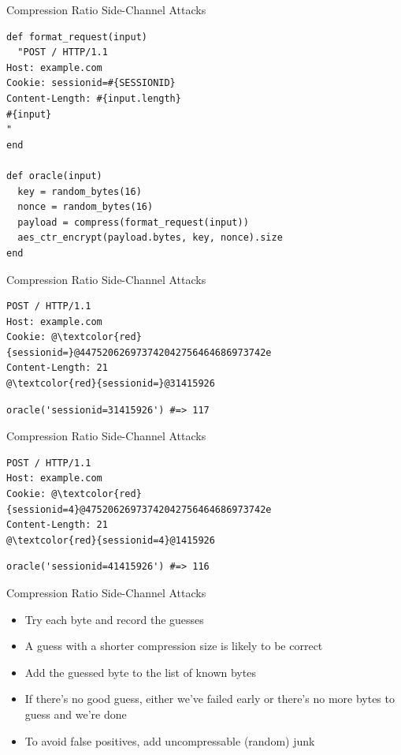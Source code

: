 \documentclass[presentation]{beamer}
\begin{document}
\begin{frame}[fragile,label={sec:org94f0a1a}]{Compression Ratio Side-Channel Attacks}
 \begin{verbatim}
def format_request(input)
  "POST / HTTP/1.1
Host: example.com
Cookie: sessionid=#{SESSIONID}
Content-Length: #{input.length}
#{input}
"
end

def oracle(input)
  key = random_bytes(16)
  nonce = random_bytes(16)
  payload = compress(format_request(input))
  aes_ctr_encrypt(payload.bytes, key, nonce).size
end
\end{verbatim}
\end{frame}

\begin{frame}[fragile,label={sec:org4385c75}]{Compression Ratio Side-Channel Attacks}
 \begin{verbatim}
POST / HTTP/1.1
Host: example.com
Cookie: @\textcolor{red}{sessionid=}@447520626973742042756464686973742e
Content-Length: 21
@\textcolor{red}{sessionid=}@31415926
\end{verbatim}

\begin{verbatim}
oracle('sessionid=31415926') #=> 117
\end{verbatim}
\end{frame}

\begin{frame}[fragile,label={sec:orgc1d28e4}]{Compression Ratio Side-Channel Attacks}
 \begin{verbatim}
POST / HTTP/1.1
Host: example.com
Cookie: @\textcolor{red}{sessionid=4}@47520626973742042756464686973742e
Content-Length: 21
@\textcolor{red}{sessionid=4}@1415926
\end{verbatim}

\begin{verbatim}
oracle('sessionid=41415926') #=> 116
\end{verbatim}
\end{frame}

\begin{frame}[label={sec:org08ffb33}]{Compression Ratio Side-Channel Attacks}
\begin{itemize}
\item Try each byte and record the guesses
\item A guess with a shorter compression size is likely to be correct
\item Add the guessed byte to the list of known bytes
\item If there's no good guess, either we've failed early or there's no
more bytes to guess and we're done
\item To avoid false positives, add uncompressable (random) junk
\end{itemize}
\end{frame}
\end{document}
